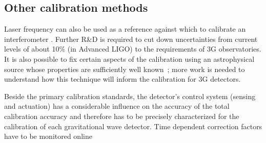 \subsection{Other calibration methods}
Laser frequency can also be used as a reference against which to calibrate an interferometer \cite{Leong2012, PhysRevD.95.062003}. Further R\&D is required to cut down uncertainties from current levels of about 10\% (in Advanced LIGO) to the requirements of 3G observatories.
It is also possible to fix certain aspects of the calibration using an astrophysical source whose properties are sufficiently well known~\cite{CalibrationGW170817,Pitkin:2015kgm}; more work is needed to understand how this technique will inform the calibration for 3G detectors.


Beside the primary calibration standards, the detector's control system (sensing and actuation) has a considerable influence on the accuracy of the total calibration accuracy and therefore has to be precisely characterized for the calibration of each gravitational wave detector. Time dependent correction factors have to be monitored online 

